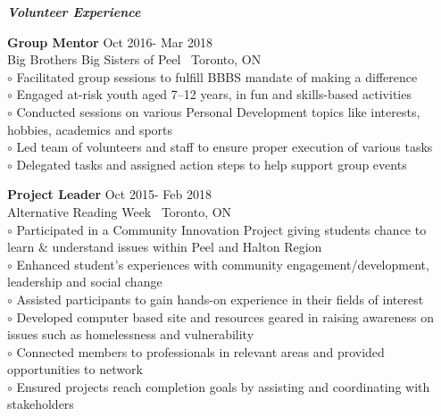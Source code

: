 \documentclass{article}
\begin{document}
\begin{center}
  \large  \textcolor{ablue}{\textit{\textbf{Volunteer Experience}}}
\end{center}

\noindent \textbf{Group Mentor}                   
\hfill Oct 2016- Mar 2018
\\Big Brothers Big Sisters of Peel   \textbar \ Toronto, ON        
\\ $\circ$ Facilitated group sessions to fulfill BBBS mandate of making a difference
\\ $\circ$ Engaged at-risk youth aged 7–12 years, in fun and skills-based activities
\\ $\circ$ Conducted sessions on various Personal Development topics like interests, hobbies, academics and  sports
\\ $\circ$ Led team of volunteers and staff to ensure proper execution of various tasks
\\ $\circ$ Delegated tasks and assigned action steps to help support group events 

\bigskip

\noindent \textbf{Project Leader}                                                                                                                                 
\hfill Oct 2015- Feb 2018
\\Alternative Reading Week \textbar \ Toronto, ON                                                                 
\\ $\circ$ Participated in a Community Innovation Project giving students chance to learn \& understand issues within Peel and Halton Region
\\$\circ$ Enhanced student’s experiences with community engagement/development, leadership and social change
\\ $\circ$ Assisted participants to gain hands-on experience in their fields of interest
\\ $\circ$ Developed computer based site and resources geared in raising awareness on issues such as homelessness and vulnerability
\\ $\circ$ Connected members to professionals in relevant areas and provided opportunities to network
\\ $\circ$ Ensured projects reach completion goals by assisting and coordinating with stakeholders
\end{document}
